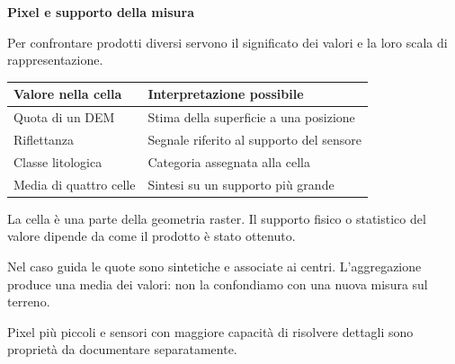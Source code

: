 \documentclass[12pt,aspectratio=1610]{beamer}
\newcommand{\PBody}[1]{\par{\fontsize{11.3}{14.8}\selectfont #1\par}}
\newcommand{\PSmall}[1]{\par{\fontsize{9.8}{13.1}\selectfont #1\par}}
\newcommand{\PInfo}[1]{%
\begin{tcolorbox}[enhanced,arc=1.6mm,boxrule=.55pt,colback=GeoTint,
 colframe=Rule!80!Classical,left=2.3mm,right=2.3mm,top=2mm,bottom=2mm,
 before skip=1mm,after skip=1mm]
\PSmall{#1}\end{tcolorbox}}
\begin{document}
\begin{frame}[plain]\hypertarget{slide18}{}
\begin{lrbox}{\TitleBox}
\begin{minipage}[t]{17.7cm}\raggedright\color{Ink}\fontsize{11.3}{14.8}\selectfont
\color{Navy}\bfseries\fontsize{20.6}{24.5}\selectfont Pixel e supporto della misura
\end{minipage}\end{lrbox}

\begin{lrbox}{\RecallBox}
\begin{minipage}[t]{14.3cm}\raggedright\color{Ink}\fontsize{11.3}{14.8}\selectfont
\fontsize{10.3}{13.8}\selectfont Per confrontare prodotti diversi servono il significato dei valori e la loro scala di rappresentazione.
\end{minipage}\end{lrbox}

\begin{lrbox}{\PilotLeftBox}
\begin{minipage}[t]{10.05cm}\raggedright\color{Ink}\fontsize{11.3}{14.8}\selectfont
{\fontsize{10.2}{13.1}\selectfont\renewcommand{\arraystretch}{1.45}\begin{tabular}{@{}p{4.2cm}p{4.8cm}@{}}\toprule
\textbf{Valore nella cella} & \textbf{Interpretazione possibile}\\\midrule
Quota di un DEM & Stima della superficie a una posizione\\
Riflettanza & Segnale riferito al supporto del sensore\\
Classe litologica & Categoria assegnata alla cella\\
Media di quattro celle & Sintesi su un supporto più grande\\
\bottomrule\end{tabular}}

\end{minipage}\end{lrbox}

\begin{lrbox}{\PilotRightBox}
\begin{minipage}[t]{7.55cm}\raggedright\color{Ink}\fontsize{11.3}{14.8}\selectfont
\PBody{La cella è una parte della geometria raster. Il supporto fisico o statistico del valore dipende da come il prodotto è stato ottenuto.}
\vspace{2.5mm}
\PInfo{Nel caso guida le quote sono sintetiche e associate ai centri. L’aggregazione produce una media dei valori: non la confondiamo con una nuova misura sul terreno.}
\PBody{Pixel più piccoli e sensori con maggiore capacità di risolvere dettagli sono proprietà da documentare separatamente.}
\vspace{2.5mm}


\end{minipage}
\end{lrbox}
\end{frame}
\end{document}
